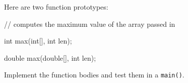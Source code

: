 Here are two function prototypes:



\begin{consolethree}[escapeinside=||]

// computes the maximum value of the array passed in

int max(int[], int len);

double max(double[], int len);

\end{consolethree}



Implement the function bodies and test them in a \texttt{main()}.

